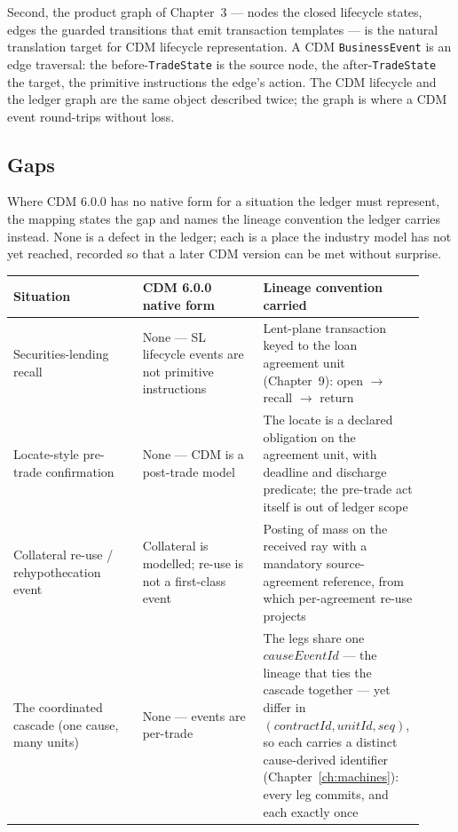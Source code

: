 \documentclass[11pt,a4paper]{article}
\begin{document}
Second, the product graph of Chapter~3 --- nodes the closed lifecycle states,
edges the guarded transitions that emit transaction templates --- is the natural
translation target for CDM lifecycle representation. A CDM \texttt{BusinessEvent}
is an edge traversal: the before-\texttt{TradeState} is the source node, the
after-\texttt{TradeState} the target, the primitive instructions the edge's
action. The CDM lifecycle and the ledger graph are the same object described
twice; the graph is where a CDM event round-trips without loss.

\subsection{Gaps}

Where CDM 6.0.0 has no native form for a situation the ledger must represent,
the mapping states the gap and names the lineage convention the ledger carries
instead. None is a defect in the ledger; each is a place the industry model has
not yet reached, recorded so that a later CDM version can be met without
surprise.

\begin{center}
\small
\begin{tabular}{@{}p{0.30\linewidth}p{0.28\linewidth}p{0.34\linewidth}@{}}
\toprule
\textbf{Situation} & \textbf{CDM 6.0.0 native form} & \textbf{Lineage convention carried} \\
\midrule
Securities-lending recall & None --- SL lifecycle events are not primitive
  instructions & Lent-plane transaction keyed to the loan agreement unit
  (Chapter~9): open $\to$ recall $\to$ return \\
Locate-style pre-trade confirmation & None --- CDM is a post-trade model & The
  locate is a declared obligation on the agreement unit, with deadline and
  discharge predicate; the pre-trade act itself is out of ledger scope \\
Collateral re-use / rehypothecation event & Collateral is modelled; re-use is
  not a first-class event & Posting of mass on the received ray with a
  mandatory source-agreement reference, from which per-agreement re-use projects \\
The coordinated cascade (one cause, many units) & None --- events are
  per-trade & The legs share one $\mathit{causeEventId}$ --- the lineage that ties
  the cascade together --- yet differ in $(\mathit{contractId},\mathit{unitId},\mathit{seq})$,
  so each carries a distinct cause-derived identifier (Chapter~\ref{ch:machines}):
  every leg commits, and each exactly once \\
\bottomrule
\end{tabular}
\end{center}
\end{document}
